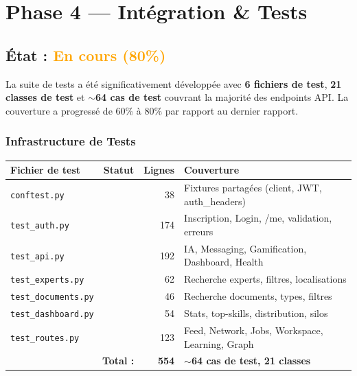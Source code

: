 \documentclass[12pt,a4paper]{article}
\newcommand{\cmark}{\textcolor{vert}{\ding{51}}}
\begin{document}
\section{Phase 4 — Intégration \& Tests}

\subsection{État : \textcolor{orange}{En cours (80\%)}}

La suite de tests a été significativement développée avec \textbf{6 fichiers de test}, \textbf{21 classes de test} et \textbf{$\sim$64 cas de test} couvrant la majorité des endpoints API. La couverture a progressé de 60\% à 80\% par rapport au dernier rapport.

\subsubsection{Infrastructure de Tests}

\begin{center}
\renewcommand{\arraystretch}{1.3}
\begin{tabular}{|l|c|r|l|}
\hline
\rowcolor{bleu!15}
\textbf{Fichier de test} & \textbf{Statut} & \textbf{Lignes} & \textbf{Couverture} \\
\hline
\texttt{conftest.py} & \cmark & 38 & Fixtures partagées (client, JWT, auth\_headers) \\
\hline
\texttt{test\_auth.py} & \cmark & 174 & Inscription, Login, /me, validation, erreurs \\
\hline
\texttt{test\_api.py} & \cmark & 192 & IA, Messaging, Gamification, Dashboard, Health \\
\hline
\texttt{test\_experts.py} & \cmark & 62 & Recherche experts, filtres, localisations \\
\hline
\texttt{test\_documents.py} & \cmark & 46 & Recherche documents, types, filtres \\
\hline
\texttt{test\_dashboard.py} & \cmark & 54 & Stats, top-skills, distribution, silos \\
\hline
\texttt{test\_routes.py} & \cmark & 123 & Feed, Network, Jobs, Workspace, Learning, Graph \\
\hline
\multicolumn{2}{|r|}{\textbf{Total :}} & \textbf{554} & \textbf{$\sim$64 cas de test, 21 classes} \\
\hline
\end{tabular}
\end{center}
\end{document}
